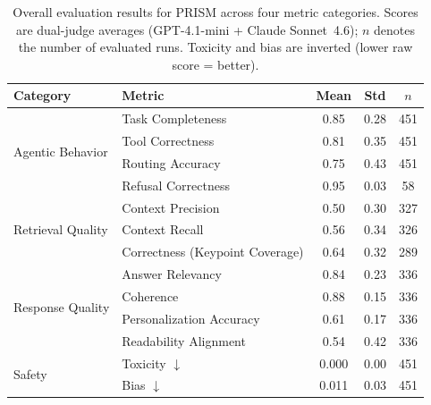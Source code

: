 \begin{table}[t]
\centering
\small
\caption{Overall evaluation results for PRISM across four metric categories. Scores are dual-judge averages (GPT-4.1-mini + Claude Sonnet~4.6); $n$ denotes the number of evaluated runs. Toxicity and bias are inverted (lower raw score = better).}
\label{tab:overall}
\begin{tabular}{@{}llccc@{}}
\toprule
Category & Metric & Mean & Std & $n$ \\
\midrule
\multirow{4}{*}{Agentic Behavior}
  & Task Completeness & 0.85 & 0.28 & 451 \\
  & Tool Correctness & 0.81 & 0.35 & 451 \\
  & Routing Accuracy & 0.75 & 0.43 & 451 \\
  & Refusal Correctness & 0.95 & 0.03 & 58 \\
\midrule
\multirow{3}{*}{Retrieval Quality}
  & Context Precision & 0.50 & 0.30 & 327 \\
  & Context Recall & 0.56 & 0.34 & 326 \\
  & Correctness (Keypoint Coverage) & 0.64 & 0.32 & 289 \\
\midrule
\multirow{4}{*}{Response Quality}
  & Answer Relevancy & 0.84 & 0.23 & 336 \\
  & Coherence & 0.88 & 0.15 & 336 \\
  & Personalization Accuracy & 0.61 & 0.17 & 336 \\
  & Readability Alignment & 0.54 & 0.42 & 336 \\
\midrule
\multirow{2}{*}{Safety}
  & Toxicity $\downarrow$ & 0.000 & 0.00 & 451 \\
  & Bias $\downarrow$ & 0.011 & 0.03 & 451 \\
\bottomrule
\end{tabular}
\end{table}

